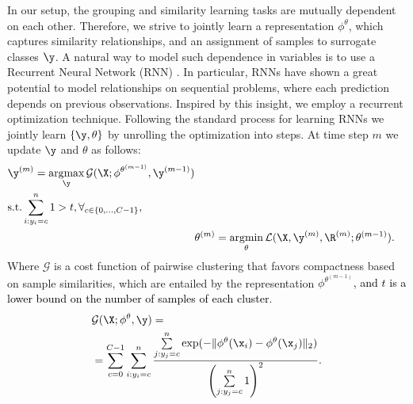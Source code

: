 \documentclass[10pt,twocolumn,letterpaper]{article}
\DeclareMathOperator*{\argmin}{\arg\!\min}
\DeclareMathOperator*{\argmax}{\arg\!\max}
\begin{document}
In our setup, the grouping and similarity learning tasks are mutually dependent on each other. Therefore, we strive to jointly learn a representation $\phi^\theta$, which captures similarity relationships, and an assignment of samples to surrogate classes $\y$.
A natural way to model such dependence in variables is to use a Recurrent Neural Network (RNN) \cite{rnn}. In particular, RNNs have shown a great potential to model relationships on sequential problems, where each prediction depends on previous observations. Inspired by this insight, we employ a recurrent optimization technique. Following the standard process for learning RNNs we jointly learn $\{\y, \theta\}$ by unrolling the optimization into steps. At time step $m$ we update $\y$ and $\theta$ as follows: 
\begin{alignat}{2}
\begin{split}
&\y^{(m)}=\argmax_{\y}\mathcal{G}(\X; \phi^{\theta^{(m-1)}},\y^{(m-1)})\\
&\text{s.t.}  \sum\limits_{i:y_i=c}^{n} 1 > t, \forall_{c \in \{0, \dots, C-1\} },
\label{eq:g}
\end{split}
\\
&\theta^{(m)} =\argmin\limits_{\theta} \mathcal{L}(\X, \y^{(m)}, \R^{(m)}; \theta^{(m-1)}). \label{eq:theta}
\end{alignat}
Where $\mathcal{G}$ is a cost function of pairwise clustering that favors compactness based on sample similarities, which are entailed by the representation $\phi^{\theta^{(m-1)}}$\textcolor{black}{, and $t$ is a lower bound on the number of samples of each cluster}.
\begin{alignat}{2}
\begin{split}
&\mathcal{G}(\X;\phi^{\theta},\y) = \\
&=\sum\limits_{c=0}^{C-1}\sum\limits_{i:y_i=c}^{n} \frac{\sum\limits_{j: y_j=c}^{n} \exp(-\| \phi^\theta(\x_i) - \phi^\theta(\x_j) \|_2)}{\left(\sum\limits_{j: y_j=c}^{n} 1\right)^2}.
\end{split}\label{eq:clustering}
\end{alignat}
\end{document}
